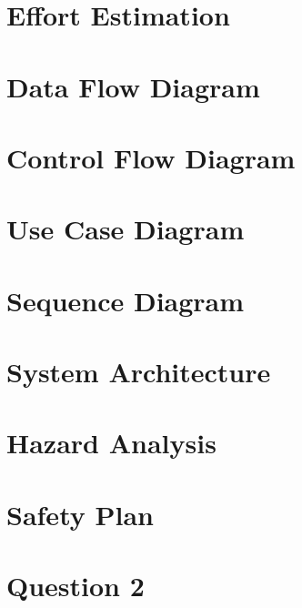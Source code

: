 \documentclass{llncs}
\begin{document}
\section{Effort Estimation}
 \newpage

\section{Data Flow Diagram}
 \newpage

\section{Control Flow Diagram}
 \newpage


\section{Use Case Diagram}
 \newpage


\section{Sequence Diagram}
 \newpage

\section{System Architecture}
 \newpage

\section{Hazard Analysis}
 \newpage

\section{Safety Plan}


\section{Question 2}

\end{document}
